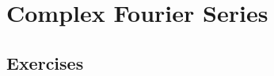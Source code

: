 \section{Complex Fourier Series}
\label{complexFourier:section}


\LO{

}


\subsection{Exercises}










